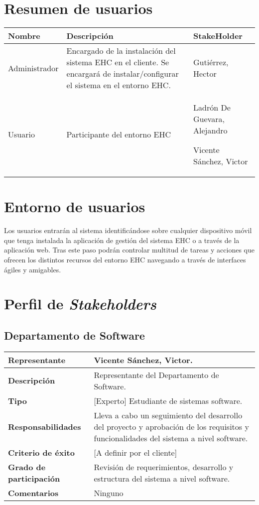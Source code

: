 \section{Resumen de usuarios}
    \begin{tabular}{|p{3cm}|p{7cm}|p{6cm}|}
        \hline \textbf{Nombre} &  \textbf{Descripción} & \textbf{StakeHolder} \\
        \hline Administrador & Encargado de la instalación del sistema EHC en el cliente. Se encargará de  instalar/configurar el sistema en el entorno EHC. & Gutiérrez, Hector \\
        \hline Usuario & Participante del entorno EHC &   Ladrón De Guevara, Alejandro \par Vicente Sánchez, Victor \\
        \hline
    \end{tabular}

\section{Entorno de usuarios}
    Los usuarios entrarán al sistema identificándose sobre cualquier dispositivo móvil que tenga instalada la aplicación de gestión del sistema EHC o a través de la aplicación web. Tras este paso podrán controlar multitud de tareas y acciones que ofrecen los distintos recursos del entorno EHC navegando a través de interfaces ágiles y amigables.

\section{Perfil de \textit{Stakeholders}}
    \subsection{Departamento de Software}
        \begin{tabular}{|p{4cm}|p{12cm}|}
            \hline \textbf{Representante} & Vicente Sánchez, Victor. \\
            \hline \textbf{Descripción} & Representante del Departamento de Software. \\
            \hline \textbf{Tipo} &  [Experto] Estudiante de sistemas software. \\
            \hline \textbf{Responsabilidades} &  Lleva a cabo un seguimiento del desarrollo del proyecto y aprobación de  los requisitos y funcionalidades del sistema a nivel software.\\
            \hline \textbf{Criterio de éxito} &  [A definir por el cliente]\\
            \hline \textbf{Grado de participación} &  Revisión de requerimientos, desarrollo y estructura del sistema a nivel software.\\
            \hline \textbf{Comentarios} &  Ninguno\\
            \hline
        \end{tabular}


